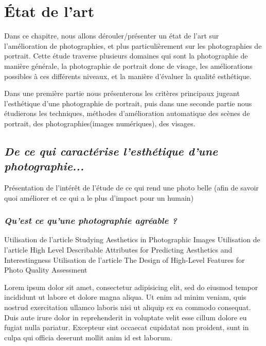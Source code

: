 \documentclass[11pt, french]{report-rd-info}
\begin{document}

\chapter{\'Etat de l'art}
\label{chap:EtatArt}

Dans ce chapitre, nous allons dérouler/présenter un état de l’art sur l’amélioration de photographies, et plus particulièrement sur les photographies de portrait. Cette étude traverse plusieurs domaines qui sont la photographie de manière générale, la photographie de portrait donc de visage, les améliorations possibles à ces différents niveaux, et la manière d’évaluer la qualité esthétique.

Dans une première partie nous présenterons les critères principaux jugeant l’esthétique d’une photographie de portrait, puis dans une seconde partie nous étudierons les techniques, méthodes d’amélioration automatique des scènes de portrait, des photographies(images numériques), des visages.

\section{\emph{De ce qui caractérise l’esthétique d’une photographie...}}
Présentation de l'intérêt de l'étude de ce qui rend une photo belle (afin de savoir quoi améliorer et ce qui a le plus d’impact pour un humain)

\subsection{\emph{Qu’est ce qu’une photographie agréable ?}}
Utilisation de l’article Studying Aesthetics in Photographic Images
Utilisation de l’article High Level Describable Attributes for Predicting Aesthetics and Interestingness
Utilisation de l’article The Design of High-Level Features for Photo Quality Assessment

Lorem ipsum dolor sit amet, consectetur adipisicing elit, sed do eiusmod tempor incididunt ut labore et dolore magna aliqua. Ut enim ad minim veniam, quis nostrud exercitation ullamco laboris nisi ut aliquip ex ea commodo consequat. Duis aute irure dolor in reprehenderit in voluptate velit esse cillum dolore eu fugiat nulla pariatur. Excepteur sint occaecat cupidatat non proident, sunt in culpa qui officia deserunt mollit anim id est laborum.
\end{document}
